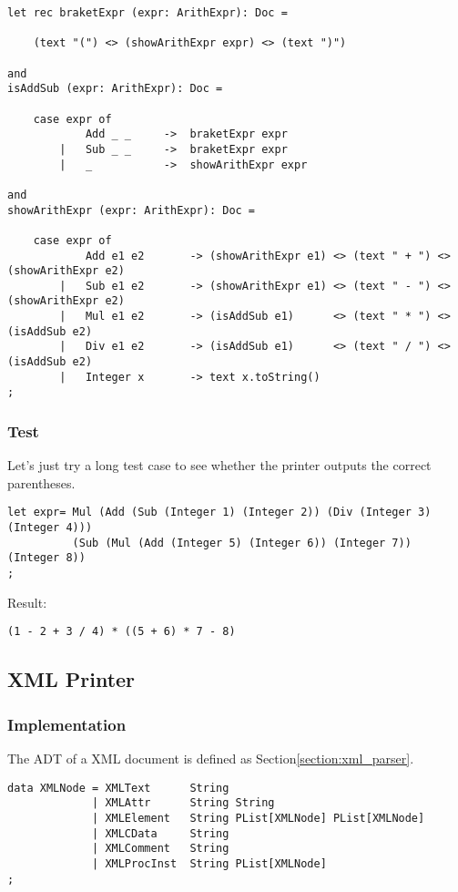 \begin{lstlisting}
let rec braketExpr (expr: ArithExpr): Doc =

    (text "(") <> (showArithExpr expr) <> (text ")")

and
isAddSub (expr: ArithExpr): Doc =

    case expr of
            Add _ _     ->  braketExpr expr
        |   Sub _ _     ->  braketExpr expr
        |   _           ->  showArithExpr expr

and
showArithExpr (expr: ArithExpr): Doc =

    case expr of
            Add e1 e2       -> (showArithExpr e1) <> (text " + ") <> (showArithExpr e2)
        |   Sub e1 e2       -> (showArithExpr e1) <> (text " - ") <> (showArithExpr e2)
        |   Mul e1 e2       -> (isAddSub e1)      <> (text " * ") <> (isAddSub e2)
        |   Div e1 e2       -> (isAddSub e1)      <> (text " / ") <> (isAddSub e2)
        |   Integer x       -> text x.toString()
;
\end{lstlisting}

\subsubsection{Test}
Let's just try a long test case to see whether the printer outputs the correct parentheses.

\begin{lstlisting}
let expr= Mul (Add (Sub (Integer 1) (Integer 2)) (Div (Integer 3) (Integer 4)))
          (Sub (Mul (Add (Integer 5) (Integer 6)) (Integer 7)) (Integer 8))
;
\end{lstlisting}

Result:

\begin{lstlisting}
(1 - 2 + 3 / 4) * ((5 + 6) * 7 - 8)
\end{lstlisting}

\subsection{XML Printer}

\subsubsection{Implementation}
The ADT of a XML document is defined as Section\ref{section:xml_parser}.

\begin{lstlisting}
data XMLNode = XMLText      String
             | XMLAttr      String String
             | XMLElement   String PList[XMLNode] PList[XMLNode]
             | XMLCData     String
             | XMLComment   String
             | XMLProcInst  String PList[XMLNode]
;
\end{lstlisting}

